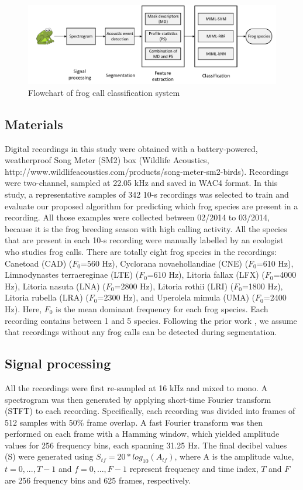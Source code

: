 \begin{figure}[htb!]
\centering
\includegraphics[width=\textwidth]{image/Ch6/flowchart.pdf}
\caption{Flowchart of frog call classification system}
\label{fig:flowchart}
\end{figure}



\subsection{Materials}
Digital recordings in this study were obtained with a battery-powered, weatherproof Song
Meter (SM2) box (Wildlife Acoustics, http://www.wildlifeacoustics.com/products/song-meter-sm2-birds). Recordings were two-channel, sampled at 22.05 kHz and saved in WAC4 format. In this study, a representative samples of 342 10-s recordings was selected to train and evaluate our proposed algorithm for predicting which frog species are present in a recording. All those examples were collected between 02/2014 to 03/2014, because it is the frog breeding season with high calling activity. All the species that are present in each 10-s recording were manually labelled by an ecologist who studies frog calls.
There are totally eight frog species in the recordings: Canetoad (CAD) 
($F_{0}$=560 Hz), Cyclorana novaehollandiae (CNE) ($F_{0}$=610 Hz), Limnodynastes terraereginae (LTE) ($F_{0}$=610 Hz), Litoria fallax (LFX) ($F_{0}$=4000 Hz), Litoria nasuta (LNA) ($F_{0}$=2800 Hz), Litoria rothii (LRI) ($F_{0}$=1800 Hz), Litoria rubella (LRA) ($F_{0}$=2300 Hz), and Uperolela mimula (UMA) ($F_{0}$=2400 Hz). Here, $F_{0}$ is the mean dominant frequency for each frog species. Each recording contains between 1 and 5 species. Following the prior work \cite{briggs2012acoustic}, we assume that recordings without any frog calls can be detected during segmentation.


\subsection{Signal processing}
All the recordings were first re-sampled at 16 kHz and mixed to mono. A spectrogram was then generated by applying short-time Fourier transform (STFT) to each recording. Specifically, each recording was
divided into frames of 512 samples with 50\% frame overlap.
A fast Fourier transform was then performed on each frame with a Hamming window, which yielded amplitude values for 256 frequency bins, each spanning 31.25 Hz. The final
decibel values (S) were generated using $S_{tf} = 20*log_{10}(A_{tf})$,
where A is the amplitude value, $t=0,...,T-1$ and $f=0,...,F-1$ represent frequency and time index, $T$ and $F$ are 256 frequency bins and 625 frames, respectively. 

